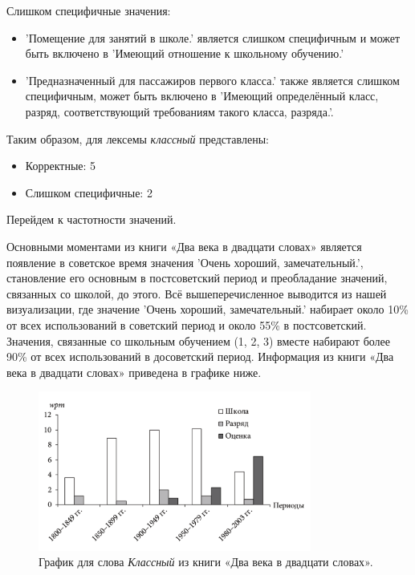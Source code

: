 Слишком специфичные значения:
\begin{itemize}
    \item ’Помещение для занятий в школе.’ является слишком специфичным
и может быть включено в ’Имеющий отношение к школьному обучению.’

    \item ’Предназначенный для пассажиров первого класса.’ также является слишком специфичным,
может быть включено в ’Имеющий определённый класс, разряд, соответствующий требованиям такого класса, разряда.’.
\end{itemize}

Таким образом, для лексемы \textit{классный} представлены:

\begin{itemize}
    \item Корректные: 5
    \item Слишком специфичные: 2
\end{itemize}

Перейдем к частотности значений.

Основными моментами из книги «Два века в двадцати словах» является появление
в советское время значения ’Очень хороший, замечательный.’,
становление его основным в постсоветский период и
преобладание значений, связанных со школой, до этого.
Всё вышеперечисленное выводится из нашей визуализации,
где значение ’Очень хороший, замечательный.’ набирает около 10\% от всех
использований в советский период и около 55\% в постсоветский.
Значения, связанные со школьным обучением (1, 2, 3) вместе набирают
более 90\% от всех использований в досоветский период.
Информация из книги «Два века в двадцати словах» приведена в графике ниже.

\begin{figure}[H]
    \centering %
    \includegraphics[width=0.8\textwidth]{img/book/klassnij/all}
    \caption{График для слова \textit{Классный} из книги «Два века в двадцати словах».}
\end{figure}

